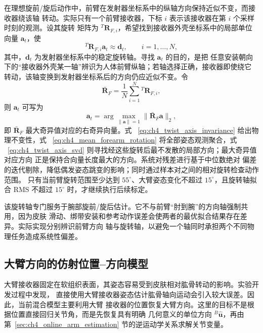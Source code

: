 在理想旋前/旋后动作中，前臂在发射器坐标系中的纵轴方向保持近似不变，而接收器绕该轴
转动。实际只有一个前臂接收器，下标 $i$ 表示该接收器在第 $i$ 个采样时刻的观测。设其旋转
矩阵为 ${}^{T}\boldsymbol R_{F,i}$，希望找到接收器外壳坐标系中的局部单位向量
$\boldsymbol a_t$，使
\begin{equation}
  {}^{T}\boldsymbol R_{F,i}\boldsymbol a_t\approx\boldsymbol d_t,
  \qquad i=1,\ldots,N,
  \label{eq:ch4_twist_axis_invariance}
\end{equation}
其中，$\boldsymbol d_t$ 为发射器坐标系中的稳定旋转轴。寻找 $\boldsymbol a_t$ 的目的，是把
任意安装朝向下的“接收器外壳某一轴”辨识为人体前臂纵轴；若轴选择正确，接收器即使绕它
转动，该轴变换到发射器坐标系后的方向仍应近似不变。令
\begin{equation}
  \bar{\boldsymbol R}_F=\frac{1}{N}
  \sum_{i=1}^{N}{}^{T}\boldsymbol R_{F,i},
  \label{eq:ch4_mean_forearm_rotation}
\end{equation}
则 $\boldsymbol a_t$ 可写为
\begin{equation}
  \boldsymbol a_t=
  \arg\max_{\lVert\boldsymbol a\rVert=1}
  \lVert\bar{\boldsymbol R}_F\boldsymbol a\rVert_2,
  \label{eq:ch4_twist_axis_svd}
\end{equation}
即 $\bar{\boldsymbol R}_F$ 最大奇异值对应的右奇异向量。式
~\eqref{eq:ch4_twist_axis_invariance} 给出物理不变性，式
~\eqref{eq:ch4_mean_forearm_rotation} 将全部姿态观测聚合，式
~\eqref{eq:ch4_twist_axis_svd} 则寻找经这些旋转后最不发散的局部方向；最大奇异值对应方向
正是保持合向量长度最大的方向。系统对残差进行基于中位数绝对
偏差的迭代剔除，降低偶发姿态跳变的影响；同时通过样本对之间的相对旋转检查动作范围。
只有当前臂旋转范围至少达到 $55^\circ$、大臂姿态变化不超过 $15^\circ$，且旋转轴拟合
RMS 不超过 $15^\circ$ 时，才继续执行后续标定。

该旋转轴专门服务于腕部旋前/旋后估计。它不与前臂“肘到腕”的方向轴强制共用，因为皮肤
滑动、绑带安装和参考动作误差会使两者的最优拟合结果存在差异。实际实现分别辨识前臂方向
轴与旋转轴，以避免一个轴同时承担两个不同物理任务造成系统性偏差。

\subsection{大臂方向的仿射位置--方向模型}
\label{subsec:ch4_upper_arm_affine_model}

大臂接收器固定在软组织表面，其姿态容易受到皮肤相对肱骨转动的影响。实验开发过程中发现，
直接使用大臂接收器姿态估计肱骨轴向运动会引入较大误差。因此，当前混合模型主要利用大臂
接收器的位置恢复大臂方向。这里的目标不是根据位置直接回归关节角，而是先恢复具有明确
几何意义的单位方向 ${}^{B}\hat{\boldsymbol u}$，再由第~\ref{sec:ch4_online_arm_estimation}
节的逆运动学关系求解关节变量。


